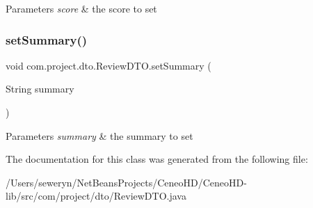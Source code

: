 \begin{DoxyParams}{Parameters}
{\em score} & the score to set \\
\hline
\end{DoxyParams}
\mbox{\label{classcom_1_1project_1_1dto_1_1_review_d_t_o_a162e777da302c2fb3dc5a7885471232f}} 
\subsubsection{set\+Summary()}
{\footnotesize\ttfamily void com.\+project.\+dto.\+Review\+D\+T\+O.\+set\+Summary (\begin{DoxyParamCaption}\item[{String}]{summary }\end{DoxyParamCaption})}


\begin{DoxyParams}{Parameters}
{\em summary} & the summary to set \\
\hline
\end{DoxyParams}


The documentation for this class was generated from the following file\+:\begin{DoxyCompactItemize}
\item 
/\+Users/seweryn/\+Net\+Beans\+Projects/\+Ceneo\+H\+D/\+Ceneo\+H\+D-\/lib/src/com/project/dto/Review\+D\+T\+O.\+java\end{DoxyCompactItemize}
